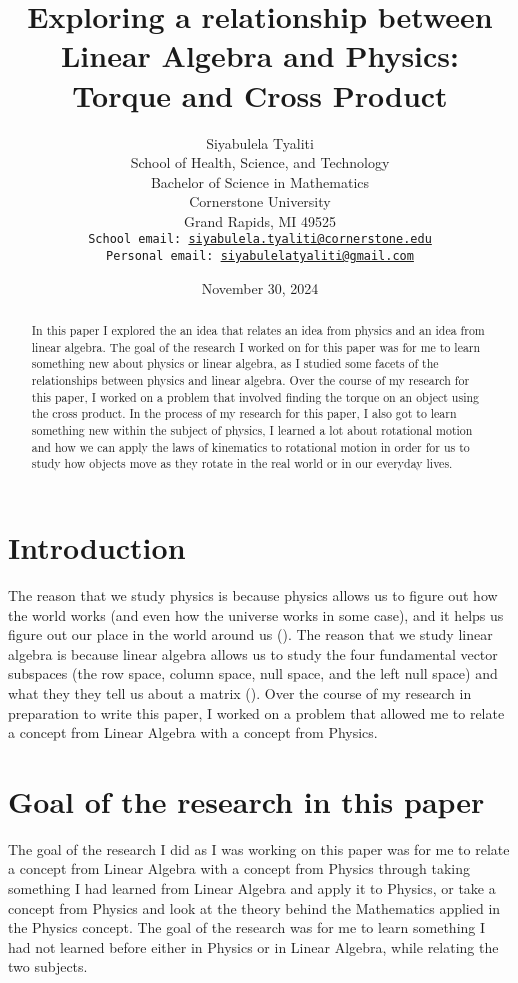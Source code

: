 \documentclass{turabian-researchpaper}
\title{Exploring a relationship between Linear Algebra and Physics: Torque and Cross Product}
\author{Siyabulela Tyaliti \\
  School of Health, Science, and Technology \\
  Bachelor of Science in Mathematics \\ 
  Cornerstone University \\
  Grand Rapids, MI 49525 \\
  \texttt{School email: \href{mailto:siyabulela.tyaliti@cornerstone.edu} {siyabulela.tyaliti@cornerstone.edu}} \\ 
  \texttt{Personal email: \href{mailto:siyabulelatyaliti@gmail.com}{siyabulelatyaliti@gmail.com}} \\ 
  }
\date{November 30, 2024}
\begin{document}
\maketitle

\begin{abstract}
    In this paper I explored the an idea that relates an idea from physics and an idea from linear algebra. The goal of the research I worked on for this paper was for me to learn something new about physics or linear algebra, as I studied some facets of the relationships between physics and linear algebra. Over the course of my research for this paper, I worked on a problem that involved finding the torque on an object using the cross product. In the process of my research for this paper, I also got to learn something new within the subject of physics, I learned a lot about rotational motion and how we can apply the laws of kinematics to rotational motion in order for us to study how objects move as they rotate in the real world or in our everyday lives. 
\end{abstract}

\section{Introduction} 
The reason that we study physics is because physics allows us to figure out how the world works (and even how the universe works in some case), and it helps us figure out our place in the world around us (\cite{CrashCoursePhysicsPreview2024}). The reason that we study linear algebra is because linear algebra allows us to study the four fundamental vector subspaces (the row space, column space, null space, and the left null space) and what they they tell us about a matrix (\cite{TheBigPictureOfLinearAlgebra2024}). Over the course of my research in preparation to write this paper, I worked on a problem that allowed me to relate a concept from Linear Algebra with a concept from Physics. 

\section{Goal of the research in this paper} 

The goal of the research I did as I was working on this paper was for me to relate a concept from Linear Algebra with a concept from Physics through taking something I had learned from Linear Algebra and apply it to Physics, or take a concept from Physics and look at the theory behind the Mathematics applied in the Physics concept. The goal of the research was for me to learn something I had not learned before either in Physics or in Linear Algebra, while relating the two subjects.   
\end{document}
